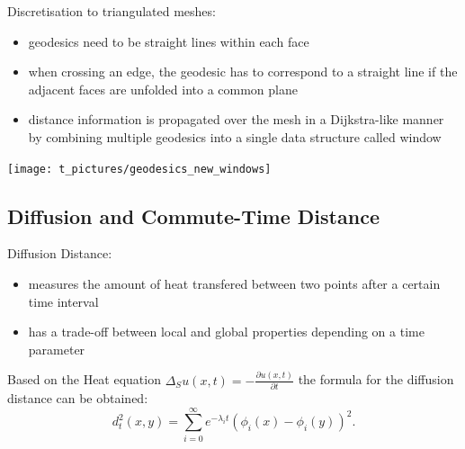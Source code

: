 \documentclass[]{beamer}
\begin{document}
	\begin{frame}
		Discretisation to triangulated meshes:
		\begin{itemize}
			\item geodesics need to be straight lines within each face
			\item when crossing an edge, the geodesic has to correspond to a straight line if the adjacent faces are unfolded into a common plane
			\item distance information is propagated over the mesh in a Dijkstra-like manner by combining multiple geodesics into a single data structure called window
		\end{itemize}
		\texttt{[image: t\_pictures/geodesics\_new\_windows]} \\
	\end{frame}

\subsection{Diffusion and Commute-Time Distance}
	\begin{frame}
		Diffusion Distance:\\
		\begin{itemize}
			\item measures the amount of heat transfered between two points after a certain time interval
			\item has a trade-off between local and global properties depending on a time parameter
		\end{itemize}
		\pause
		Based on the Heat equation $\Delta_S u(x,t) = -\frac{\partial u(x,t)}{\partial t}$
		the formula for the diffusion distance can be obtained:
		$$ d_t^2(x,y) = \sum_{i=0}^{\infty} e^{-\lambda_i t} (\phi_i(x) - \phi_i(y))^2. $$

	\end{frame}
\end{document}
